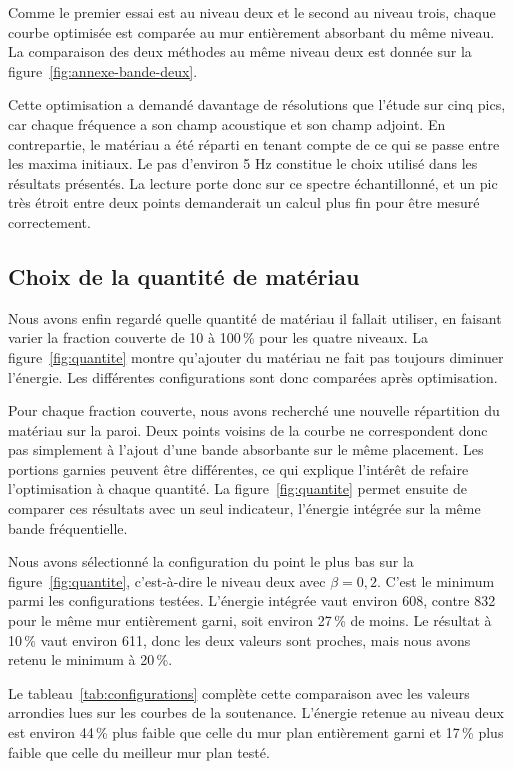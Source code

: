 \documentclass[11pt,a4paper]{article}
\begin{document}
Comme le premier essai est au niveau deux et le second au niveau trois, chaque courbe optimisée est comparée au mur entièrement absorbant du même niveau. La comparaison des deux méthodes au même niveau deux est donnée sur la figure~\ref{fig:annexe-bande-deux}.

Cette optimisation a demandé davantage de résolutions que l'étude sur cinq pics, car chaque fréquence a son champ acoustique et son champ adjoint. En contrepartie, le matériau a été réparti en tenant compte de ce qui se passe entre les maxima initiaux. Le pas d'environ 5 Hz constitue le choix utilisé dans les résultats présentés. La lecture porte donc sur ce spectre échantillonné, et un pic très étroit entre deux points demanderait un calcul plus fin pour être mesuré correctement.

\subsection{Choix de la quantité de matériau}
Nous avons enfin regardé quelle quantité de matériau il fallait utiliser, en faisant varier la fraction couverte de 10 à 100\,\% pour les quatre niveaux. La figure~\ref{fig:quantite} montre qu'ajouter du matériau ne fait pas toujours diminuer l'énergie. Les différentes configurations sont donc comparées après optimisation.

Pour chaque fraction couverte, nous avons recherché une nouvelle répartition du matériau sur la paroi. Deux points voisins de la courbe ne correspondent donc pas simplement à l'ajout d'une bande absorbante sur le même placement. Les portions garnies peuvent être différentes, ce qui explique l'intérêt de refaire l'optimisation à chaque quantité. La figure~\ref{fig:quantite} permet ensuite de comparer ces résultats avec un seul indicateur, l'énergie intégrée sur la même bande fréquentielle.

Nous avons sélectionné la configuration du point le plus bas sur la figure~\ref{fig:quantite}, c'est-à-dire le niveau deux avec $\beta=0{,}2$. C'est le minimum parmi les configurations testées. L'énergie intégrée vaut environ 608, contre 832 pour le même mur entièrement garni, soit environ 27\,\% de moins. Le résultat à 10\,\% vaut environ 611, donc les deux valeurs sont proches, mais nous avons retenu le minimum à 20\,\%.


Le tableau~\ref{tab:configurations} complète cette comparaison avec les valeurs arrondies lues sur les courbes de la soutenance. L'énergie retenue au niveau deux est environ 44\,\% plus faible que celle du mur plan entièrement garni et 17\,\% plus faible que celle du meilleur mur plan testé.
\end{document}
